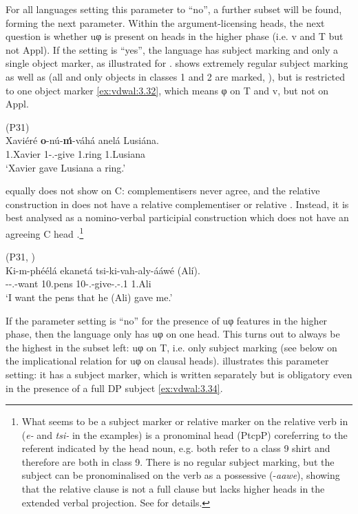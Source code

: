 \documentclass[output=paper]{langsci/langscibook}
\begin{document}
For all languages setting this parameter to \enquote{no}, a further subset will be
found, forming the next parameter. Within the argument-licensing heads, the
next question is whether uφ is present on heads in the higher phase (i.e. v and
T but not Appl). If the setting is \enquote{yes}, the language has subject marking and
only a single object marker, as illustrated for .  shows
extremely regular subject marking as well as  (all and only
objects in classes 1 and 2 are marked, \citealt{vanderWal2009}), but is
restricted to one object marker \eqref{ex:vdwal:3.32}, which means φ on T and v, but
not on Appl.

\ea\label{ex:vdwal:3.32}  (P31) \label{bkm:Ref347928062}\\
    \gll    Xaviéré  \textbf{o}{}-nú-\textbf{ḿ}{}-váhá  anelá  Lusiána.\\
            1.Xavier  1\Sm-\Pfv.\Om{}-give  1.ring  1.Lusiana\\
    \glt        ‘Xavier gave Lusiana a ring.’
\z

 equally does not show  on C: complementisers never agree, and
the relative construction in  does not have a relative complementiser or
relative . Instead, it is best analysed as a nomino-verbal participial
construction which does not have an agreeing C head
\citep{vanderWal2010}.\footnote{What seems to be a subject marker or
relative marker on the relative verb in  (\emph{e-} and \emph{tsi-} in
the examples) is a pronominal head (PtcpP) coreferring to the referent
indicated by the head noun, e.g. both refer to a class 9 shirt and therefore
are both in class 9. There is no regular subject marking, but the subject can
be pronominalised on the verb as a possessive (-\emph{aawe}), showing that the
relative clause is not a full clause but lacks higher heads in the extended
verbal projection. See \textcite{vanderWal2010} for details.}

\ea {} (P31, \citealt[210]{vanderWal2010})\\
    \gll Ki-m-phéélá  ekanetá  tsi-ki-vah-aly-ááwé  (Alí).\\
        \Fsg-\Sm-\Prs.\Cj-want  10.pens  10-\Fsg.\Om{}-give-\Pfv.\Rel{}-\Poss{}.1  1.Ali\\
    \glt    ‘I want the pens that he (Ali) gave me.’
\z

If the parameter setting is \enquote{no} for the presence of uφ features in the higher
phase, then the language only has uφ on one head. This turns out to always be
the highest in the subset left: uφ on T, i.e. only subject marking (see
 below on the implicational relation for uφ on clausal heads).
 illustrates this parameter setting: it has a subject marker, which is
written separately but is obligatory even in the presence of a full DP subject
\eqref{ex:vdwal:3.34}.
\end{document}
